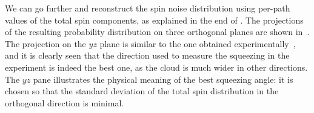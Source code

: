 We can go further and reconstruct the spin noise distribution using per-path values of the total spin components, as explained in the end of .
The projections of the resulting probability distribution on three orthogonal planes are shown in~.
The projection on the $yz$ plane is similar to the one obtained experimentally~\cite{Riedel2010}, and it is clearly seen that the direction used to measure the squeezing in the experiment is indeed the best one, as the cloud is much wider in other directions.
The $yz$ pane illustrates the physical meaning of the best squeezing angle: it is chosen so that the standard deviation of the total spin distribution in the orthogonal direction is minimal.
